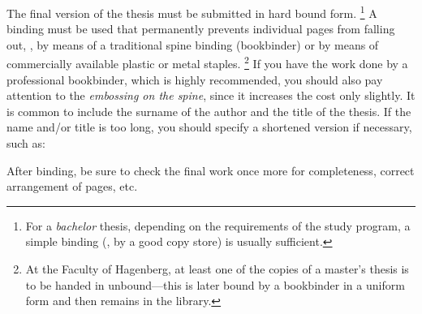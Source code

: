 The final version of the thesis must be submitted in hard bound form.%
\footnote{For a \emph{bachelor} thesis, depending on the requirements of the study
program, a simple binding (\eg, by a good copy store) is usually sufficient.}
A binding must be used that permanently prevents individual pages from falling out,
\eg, by means of a traditional spine binding (bookbinder) or by means of 
commercially available plastic or metal staples.%
\footnote{At the Faculty of Hagenberg, at least one of the copies of a master's
thesis is to be handed in unbound---this is later bound by a bookbinder in a
uniform form and then remains in the library.}
If you have the work done by a professional bookbinder, which is highly recommended,
you should also pay attention to the \emph{embossing on the spine}, since
it increases the cost only slightly. It is common to include the surname of the author
and the title of the thesis. If the name and/or title is too long, you should specify
a shortened version if necessary, such as:
%
\begin{center}
	\setlength{\fboxsep}{3mm}
\end{center}
%
After binding, be sure to check the final work once more for completeness, correct 
arrangement of pages, etc.



